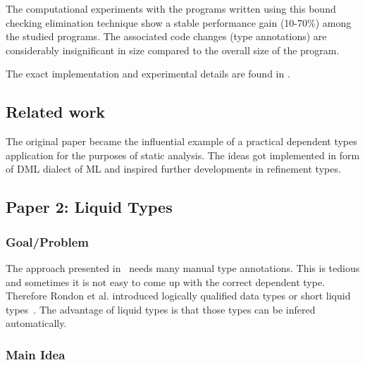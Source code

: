 \documentclass[a4paper,UKenglish]{lipics-v2016}
\begin{document}
The computational experiments with the programs written using this bound
checking elimination technique show a stable performance gain (10-70\%) among
the studied programs. The associated code changes (type annotations) are
considerably insignificant in size compared to the overall size of the program.

The exact implementation and experimental details are found in \cite{Xi:1998}.

\subsection{Related work}

The original paper became the influential example of a practical dependent
types application for the purposes of static analysis. The ideas got
implemented in form of DML dialect of ML \cite{XiPhd:1998} and inspired further
developments in refinement types.


\subsection{Paper 2: Liquid Types}

\subsubsection{Goal/Problem}
The approach presented in~\cite{Xi:1998:EAB} needs many manual type annotations.
This is tedious and sometimes it is not easy to come up with the correct dependent type.
Therefore Rondon et al. introduced logically qualified data types or short liquid types~\cite{Rondon:2008:LT}.
The advantage of liquid types is that those types can be infered automatically.

\subsubsection{Main Idea}
\end{document}
